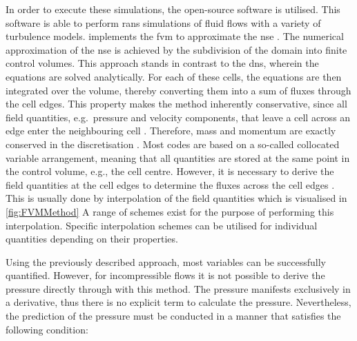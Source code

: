 In order to execute these simulations, the open-source software  is utilised. 
This software is able to perform \acrshort{rans} simulations of fluid flows with a variety of turbulence models. 
 implements the \acrfull{fvm} to approximate the \acrshort{nse} \citep{weller_tensorial_1998}.
The numerical approximation of the \acrshort{nse} is achieved by the subdivision of the domain into finite control volumes. 
This approach stands in contrast to the \acrshort{dns}, wherein the equations are solved analytically.
For each of these cells, the equations are then integrated over the volume, thereby converting them into a sum of fluxes through the cell edges.
This property makes the method inherently conservative, since all field quantities, e.g.~pressure and velocity components, that leave a cell across an edge enter the neighbouring cell \citep{moukalled_finite_2016}. 
Therefore, mass and momentum are exactly conserved in the discretisation \citep{weller_tensorial_1998}.
Most codes are based on a so-called collocated variable arrangement, meaning that all quantities are stored at the same point in the control volume, e.g., the cell centre.
However, it is necessary to derive the field quantities at the cell edges to determine the fluxes across the cell edges \citep{schlatter_lecture_2025}.
This is usually done by interpolation of the field quantities which is visualised in \autoref{fig:FVMMethod}
A range of schemes exist for the purpose of performing this interpolation. 
Specific interpolation schemes can be utilised for individual  quantities depending on their properties.

Using the previously described approach, most variables can be successfully quantified.
However, for incompressible flows it is not possible to derive the pressure  directly through with this method.
The pressure manifests exclusively in a derivative, thus there is no explicit term to calculate the pressure.
Nevertheless, the prediction of the pressure  must be conducted in a manner that satisfies  the following condition:


